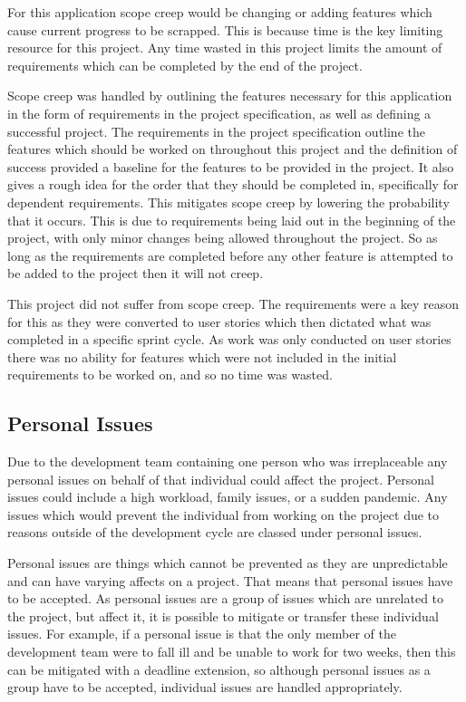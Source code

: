 \documentclass{article}
\begin{document}
For this application scope creep would be changing or adding features which cause current progress to be scrapped. This is because time is the key limiting resource for this project. Any time wasted in this project limits the amount of requirements which can be completed by the end of the project. \par

Scope creep was handled by outlining the features necessary for this application in the form of requirements in the project specification, as well as defining a successful project. The requirements in the project specification outline the features which should be worked on throughout this project and the definition of success provided a baseline for the features to be provided in the project. It also gives a rough idea for the order that they should be completed in, specifically for dependent requirements. This mitigates scope creep by lowering the probability that it occurs. This is due to requirements being laid out in the beginning of the project, with only minor changes being allowed throughout the project. So as long as the requirements are completed before any other feature is attempted to be added to the project then it will not creep. \par

This project did not suffer from scope creep. The requirements were a key reason for this as they were converted to user stories which then dictated what was completed in a specific sprint cycle. As work was only conducted on user stories there was no ability for features which were not included in the initial requirements to be worked on, and so no time was wasted. \par

\subsection{Personal Issues}

Due to the development team containing one person who was irreplaceable any personal issues on behalf of that individual could affect the project. Personal issues could include a high workload, family issues, or a sudden pandemic. Any issues which would prevent the individual from working on the project due to reasons outside of the development cycle are classed under personal issues. \par

Personal issues are things which cannot be prevented as they are unpredictable and can have varying affects on a project. That means that personal issues have to be accepted. As personal issues are a group of issues which are unrelated to the project, but affect it, it is possible to mitigate or transfer these individual issues. For example, if a personal issue is that the only member of the development team were to fall ill and be unable to work for two weeks, then this can be mitigated with a deadline extension, so although personal issues as a group have to be accepted, individual issues are handled appropriately. \par
\end{document}
